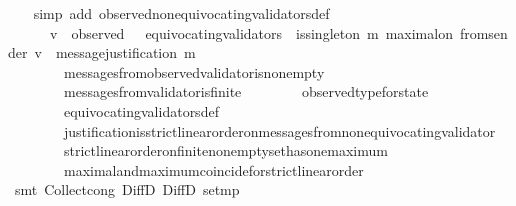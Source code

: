 \begin{isabellebody}
%
\isadelimproof
\ \ %
\endisadelimproof
%
\isatagproof
{}\isamarkupfalse%
\ {\isacharparenleft}simp\ add{\isacharcolon}\ observed{\isacharunderscore}non{\isacharunderscore}equivocating{\isacharunderscore}validators{\isacharunderscore}def{\isacharparenright}\isanewline
{}\isamarkupfalse%
\ {\isacharminus}\isanewline
\ \ \isamarkupfalse%
\ {\isachardoublequoteopen}{\isasymforall}\ {\isasymsigma}\ {\isasymin}\ {\isasymSigma}{\isachardot}\ {\isacharparenleft}{\isasymforall}\ v\ {\isasymin}\ observed\ {\isasymsigma}\ {\isacharminus}\ equivocating{\isacharunderscore}validators\ {\isasymsigma}{\isachardot}\ is{\isacharunderscore}singleton\ {\isacharbraceleft}m{\isachardot}\ maximal{\isacharunderscore}on\ {\isacharparenleft}from{\isacharunderscore}sender\ {\isacharparenleft}v{\isacharcomma}\ {\isasymsigma}{\isacharparenright}{\isacharparenright}\ message{\isacharunderscore}justification\ m{\isacharbraceright}{\isacharparenright}{\isachardoublequoteclose}\isanewline
\ \ \ \ \isamarkupfalse%
\ \isanewline
\ \ \ \ \ \ \ \ messages{\isacharunderscore}from{\isacharunderscore}observed{\isacharunderscore}validator{\isacharunderscore}is{\isacharunderscore}non{\isacharunderscore}empty\isanewline
\ \ \ \ \ \ \ \ messages{\isacharunderscore}from{\isacharunderscore}validator{\isacharunderscore}is{\isacharunderscore}finite\isanewline
\ \ \ \ \ \ \ \ observed{\isacharunderscore}type{\isacharunderscore}for{\isacharunderscore}state\isanewline
\ \ \ \ \ \ \ \ equivocating{\isacharunderscore}validators{\isacharunderscore}def\isanewline
\ \ \ \ \ \ \ \ justification{\isacharunderscore}is{\isacharunderscore}strict{\isacharunderscore}linear{\isacharunderscore}order{\isacharunderscore}on{\isacharunderscore}messages{\isacharunderscore}from{\isacharunderscore}non{\isacharunderscore}equivocating{\isacharunderscore}validator\isanewline
\ \ \ \ \ \ \ \ strict{\isacharunderscore}linear{\isacharunderscore}order{\isacharunderscore}on{\isacharunderscore}finite{\isacharunderscore}non{\isacharunderscore}empty{\isacharunderscore}set{\isacharunderscore}has{\isacharunderscore}one{\isacharunderscore}maximum\isanewline
\ \ \ \ \ \ \ \ maximal{\isacharunderscore}and{\isacharunderscore}maximum{\isacharunderscore}coincide{\isacharunderscore}for{\isacharunderscore}strict{\isacharunderscore}linear{\isacharunderscore}order\isanewline
\ \ \ \ \isamarkupfalse%
\ {\isacharparenleft}smt\ Collect{\isacharunderscore}cong\ DiffD{}\ DiffD{}\ set{\isacharunderscore}mp{\isacharparenright}\isanewline
\ \ \isamarkupfalse%

\end{isabellebody}
